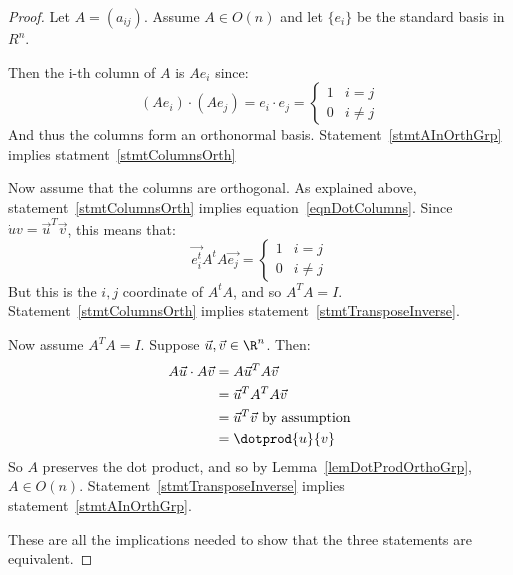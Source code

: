 \documentclass[../Main.tex]{subfiles}
\begin{document}
\begin{proof}
    Let $A = (a_{ij})$. Assume $A \in O(n)$ and let $\{e_i\}$ be the standard basis in $R^n$.\par
    Then the i-th column of $A$ is $Ae_i$ since:
    \begin{equation}
        (Ae_i) \cdot (Ae_j) = e_i \cdot e_j =
        \begin{cases}
            1 & i = j \\
            0 & i \neq j
        \end{cases}
        \label{eqnDotColumns}
    \end{equation}
    And thus the columns form an orthonormal basis. Statement~\ref{stmtAInOrthGrp} implies statment~\ref{stmtColumnsOrth}\par
    Now assume that the columns are orthogonal. As explained above, statement~\ref{stmtColumnsOrth} implies equation~\ref{eqnDotColumns}. Since $\dot{u}{v} = \vec{u}^T\vec{v}$, this means that:
    \begin{equation*}
        \vec{e_i^t}A^t A \vec{e_j} = 
        \begin{cases}
            1 & i = j \\
            0 & i \neq j
        \end{cases}
    \end{equation*}
    But this is the $i, j$ coordinate of $A^t A$, and so $A^T A = I$. Statement~\ref{stmtColumnsOrth} implies statement~\ref{stmtTransposeInverse}.\par
    Now assume $A^T A = I$. Suppose $\vec{u}, \vec{v} \in \R^n$. Then:
    \begin{align*}
        A\vec{u} \cdot A\vec{v} &= A \vec{u}^T A \vec{v} \\
        &= \vec{u}^T A^T A \vec{v} \\
        &= \vec{u}^T \vec{v} \text{ by assumption} \\
        &= \dotprod{u}{v}
    \end{align*}
    So $A$ preserves the dot product, and so by Lemma~\ref{lemDotProdOrthoGrp}, $A \in O(n)$. Statement~\ref{stmtTransposeInverse} implies statement~\ref{stmtAInOrthGrp}.\par
    These are all the implications needed to show that the three statements are equivalent.
\end{proof}
\end{document}
